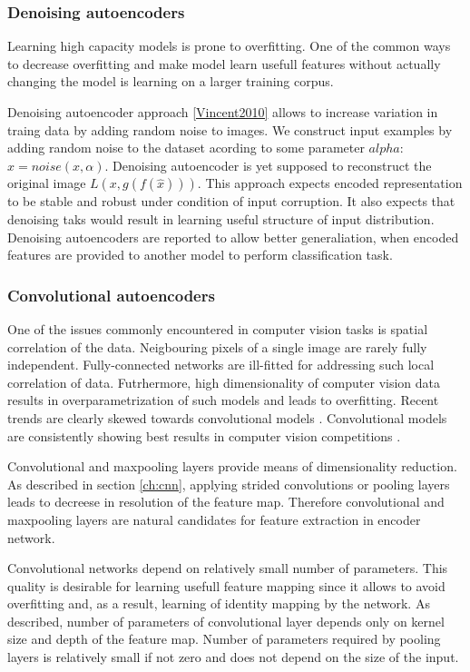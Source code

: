 \subsubsection{Denoising autoencoders}

Learning high capacity models is prone to overfitting.
One of the common ways to decrease overfitting and make model learn usefull features without actually changing the model is learning on a larger training corpus.

Denoising autoencoder approach \ref{Vincent2010} allows to increase variation in traing data by adding random noise to images. We construct input examples by adding random noise to the dataset acording to some parameter $alpha$: $\hat{x}=noise(x, \alpha)$.
Denoising autoencoder is yet supposed to reconstruct  the original image $L(x, g(f(\hat{x})))$.
This approach expects encoded representation to be stable and robust under condition of input corruption.
It also expects that denoising taks would result in learning useful structure of input distribution.
Denoising autoencoders are reported to allow better generaliation, when encoded features are provided to another model to perform classification task.

\subsubsection{Convolutional autoencoders}

One of the issues commonly encountered in computer vision tasks is spatial correlation of the data.
Neigbouring pixels of a single image are rarely fully independent.
Fully-connected networks are ill-fitted for addressing such local correlation of data.
Futrhermore, high dimensionality of computer vision data results in overparametrization of such models and leads to overfitting.
Recent trends are clearly skewed towards convolutional models \cite{He2015, Szegedy2016}.
Convolutional models are consistently showing best results in computer vision competitions \cite{ILSVRC15, Zhou2016}.

Convolutional and maxpooling layers provide means of dimensionality reduction.
As described in section \ref{ch:cnn}, applying strided convolutions or pooling layers leads to decreese in resolution of the feature map.
Therefore convolutional and maxpooling layers are natural candidates for feature extraction in encoder network.

Convolutional networks depend on relatively small number of parameters.
This quality is desirable for learning usefull feature mapping since it allows to avoid overfitting and, as a result, learning of identity mapping by the network.
As described, number of parameters of convolutional layer depends only on kernel size and depth of the feature map.
Number of parameters required by pooling layers is relatively small if not zero and does not depend on the size of the input.

